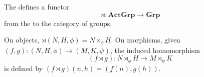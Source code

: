 \begin{proposition} \label{proposition:functoriality_of_semidirect_product_via_category_of_group_actions}
    The  defines a functor
    $$\rtimes : \mathbf{ActGrp} \longrightarrow \mathbf{Grp}$$
    from the  to the category of groups.

    On objects, $\rtimes(N, H, \phi) = N \rtimes_\phi H$.
    On morphisms, given $(f, g): (N, H, \phi) \to (M, K, \psi)$, the induced homomorphism
    $$(f \rtimes g) : N \rtimes_\phi H \longrightarrow M \rtimes_\psi K$$
    is defined by $(f \rtimes g)(n, h) = (f(n), g(h))$.
\end{proposition}
